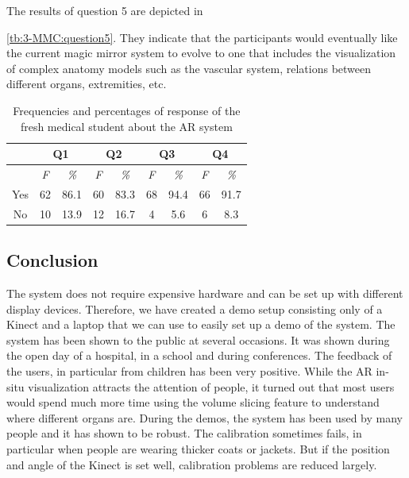 {{{{{{The results of question 5 are depicted in \tablename{\ref{tb:3-MMC:question5}. They indicate that the participants would eventually like the current magic mirror system to evolve to one that includes the visualization of complex anatomy models such as the vascular system, relations between different organs, extremities, etc. 
\begin{table}
	\caption[User study with fresh medical students]{Frequencies and percentages of response of the fresh medical student about the AR system}
	\centering
	\label{tb:3-MMC:userStudy}
	\scriptsize
	\begin{center}
		\begin{tabular}{ccccccccc}
			\multicolumn{1}{c}{\space} & \multicolumn{2}{c}{\textbf{Q1}} & \multicolumn{2}{c}{\textbf{Q2}} & \multicolumn{2}{c}{\textbf{Q3}} & \multicolumn{2}{c}{\textbf{Q4}} \\
			\hline
			\space & \textit{F} &\textit{\%}& \textit{F} &\textit{\%}& \textit{F} &\textit{\%}& \textit{F} &\textit{\%} \\
			Yes & 62 & 86.1 & 60 & 83.3 & 68 & 94.4 & 66 & 91.7 \\
			No & 10 & 13.9 & 12 & 16.7 & 4 & 5.6 & 6 & 8.3 \\
			\hline
		\end{tabular}
	\end{center}
\end{table}

\subsection{Conclusion}
The system does not require expensive hardware and can be set up with different display devices. Therefore, we have created a demo setup consisting only of a Kinect and a laptop that we can use to easily set up a demo of the system. The system has been shown to the public at several occasions. It was shown during the open day of a hospital, in a school and during conferences. The feedback of the users, in particular from children has been very positive. While the AR in-situ visualization attracts the attention of people, it turned out that most users would spend much more time using the volume slicing feature to understand where different organs are. During the demos, the system has been used by many people and it has shown to be robust. The calibration sometimes fails, in particular when people are wearing thicker coats or jackets. But if the position and angle of the Kinect is set well, calibration problems are reduced largely.

}}}}}}}
